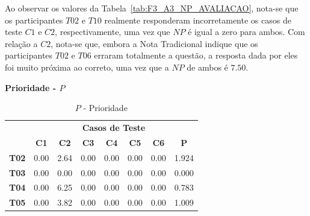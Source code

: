 Ao observar os valores da Tabela~\ref{tab:F3_A3_NP_AVALIACAO}, nota-se que os participantes $T02$ e $T10$ realmente responderam incorretamente os casos de teste $C1$ e $C2$, respectivamente, uma vez que $NP$ é igual a zero para ambos. Com relação a $C2$, nota-se que, embora a Nota Tradicional indique que os participantes $T02$ e $T06$ erraram totalmente a questão, a resposta dada por eles foi muito próxima ao correto, uma vez que a $NP$ de ambos é $7.50$.

\textbf{Prioridade - $P$}

\begin{table}[htbp]
	\centering
	\caption{$P$ - Prioridade}
	\begin{tabular}{|c|ccccccc|}
		\hline
		\rowcolor[HTML]{D0CECE} 
		\cellcolor[HTML]{D0CECE} & \multicolumn{7}{c|}{\cellcolor[HTML]{D0CECE}\textbf{Casos de Teste}} \\ \cline{2-8} 
		\rowcolor[HTML]{D9D9D9} 
		\multirow{-2}{*}{\cellcolor[HTML]{D0CECE}\textbf{Participante}} & \multicolumn{1}{c|}{\cellcolor[HTML]{D9D9D9}\textbf{C1}} & \multicolumn{1}{c|}{\cellcolor[HTML]{D9D9D9}\textbf{C2}} & \multicolumn{1}{c|}{\cellcolor[HTML]{D9D9D9}\textbf{C3}} & \multicolumn{1}{c|}{\cellcolor[HTML]{D9D9D9}\textbf{C4}} & \multicolumn{1}{c|}{\cellcolor[HTML]{D9D9D9}\textbf{C5}} & \multicolumn{1}{c|}{\cellcolor[HTML]{D9D9D9}\textbf{C6}} & \textbf{P} \\ \hline
		\textbf{T02} & \multicolumn{1}{c|}{0.00} & \multicolumn{1}{c|}{2.64} & \multicolumn{1}{c|}{0.00} & \multicolumn{1}{c|}{0.00} & \multicolumn{1}{c|}{0.00} & \multicolumn{1}{c|}{0.00} & 1.924 \\ \hline
		\rowcolor[HTML]{F2F2F2} 
		\textbf{T03} & \multicolumn{1}{c|}{\cellcolor[HTML]{F2F2F2}0.00} & \multicolumn{1}{c|}{\cellcolor[HTML]{F2F2F2}0.00} & \multicolumn{1}{c|}{\cellcolor[HTML]{F2F2F2}0.00} & \multicolumn{1}{c|}{\cellcolor[HTML]{F2F2F2}0.00} & \multicolumn{1}{c|}{\cellcolor[HTML]{F2F2F2}0.00} & \multicolumn{1}{c|}{\cellcolor[HTML]{F2F2F2}0.00} & 0.000 \\ \hline
		\textbf{T04} & \multicolumn{1}{c|}{0.00} & \multicolumn{1}{c|}{6.25} & \multicolumn{1}{c|}{0.00} & \multicolumn{1}{c|}{0.00} & \multicolumn{1}{c|}{0.00} & \multicolumn{1}{c|}{0.00} & 0.783 \\ \hline
		\rowcolor[HTML]{F2F2F2} 
		\textbf{T05} & \multicolumn{1}{c|}{\cellcolor[HTML]{F2F2F2}0.00} & \multicolumn{1}{c|}{\cellcolor[HTML]{F2F2F2}3.82} & \multicolumn{1}{c|}{\cellcolor[HTML]{F2F2F2}0.00} & \multicolumn{1}{c|}{\cellcolor[HTML]{F2F2F2}0.00} & \multicolumn{1}{c|}{\cellcolor[HTML]{F2F2F2}0.00} & \multicolumn{1}{c|}{\cellcolor[HTML]{F2F2F2}0.00} & 1.009 \\ \hline

\end{tabular}
\end{table}
